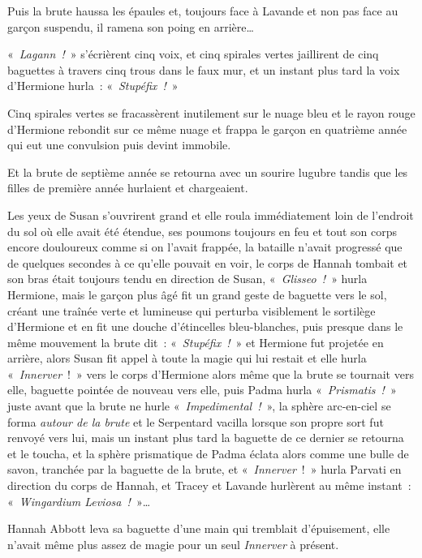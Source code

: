 Puis la brute haussa les épaules et, toujours face à Lavande et non pas face au garçon suspendu, il ramena son poing en arrière…

«~\emph{Lagann~!}~» s'écrièrent cinq voix, et cinq spirales vertes jaillirent de cinq baguettes à travers cinq trous dans le faux mur, et un instant plus tard la voix d'Hermione hurla~: «~\emph{Stupéfix~!}~»

Cinq spirales vertes se fracassèrent inutilement sur le nuage bleu et le rayon rouge d'Hermione rebondit sur ce même nuage et frappa le garçon en quatrième année qui eut une convulsion puis devint immobile.

Et la brute de septième année se retourna avec un sourire lugubre tandis que les filles de première année hurlaient et chargeaient.

\later

Les yeux de Susan s'ouvrirent grand et elle roula immédiatement loin de l'endroit du sol où elle avait été étendue, ses poumons toujours en feu et tout son corps encore douloureux comme si on l'avait frappée, la bataille n'avait progressé que de quelques secondes à ce qu'elle pouvait en voir, le corps de Hannah tombait et son bras était toujours tendu en direction de Susan, «~\emph{Glisseo~!}~» hurla Hermione, mais le garçon plus âgé fit un grand geste de baguette vers le sol, créant une traînée verte et lumineuse qui perturba visiblement le sortilège d'Hermione et en fit une douche d'étincelles bleu-blanches, puis presque dans le même mouvement la brute dit~: «~\emph{Stupéfix~!}~» et Hermione fut projetée en arrière, alors Susan fit appel à toute la magie qui lui restait et elle hurla «~\emph{Innerver}~!~» vers le corps d'Hermione alors même que la brute se tournait vers elle, baguette pointée de nouveau vers elle, puis Padma hurla «~\emph{Prismatis~!}~» juste avant que la brute ne hurle «~\emph{Impedimental~!}~», la sphère arc-en-ciel se forma \emph{autour de la brute} et le Serpentard vacilla lorsque son propre sort fut renvoyé vers lui, mais un instant plus tard la baguette de ce dernier se retourna et le toucha, et la sphère prismatique de Padma éclata alors comme une bulle de savon, tranchée par la baguette de la brute, et «~\emph{Innerver}~!~» hurla Parvati en direction du corps de Hannah, et Tracey et Lavande hurlèrent au même instant~: «~\emph{Wingardium Leviosa~!}~»…

\later

Hannah Abbott leva sa baguette d'une main qui tremblait d'épuisement, elle n'avait même plus assez de magie pour un seul \emph{Innerver} à présent.

